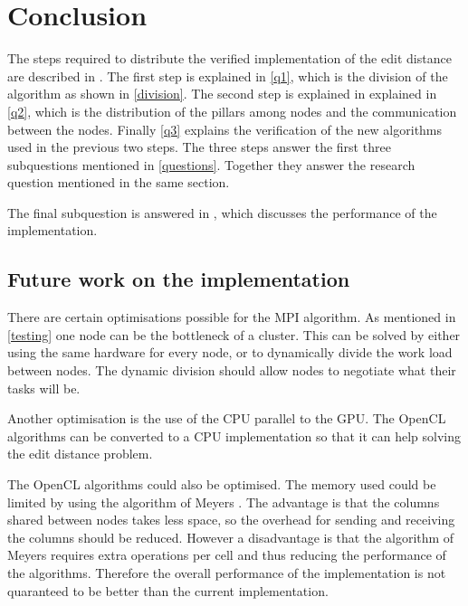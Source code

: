 \section{Conclusion}
The steps required to distribute the verified implementation of the edit distance are described in .
The first step is explained in \cref{q1}, which is the division of the algorithm as shown in \cref{division}.
The second step is explained in explained in \cref{q2}, which is the distribution of the pillars among nodes and the communication between the nodes.
Finally \cref{q3} explains the verification of the new algorithms used in the previous two steps.
The three steps answer the first three subquestions mentioned in \cref{questions}.
Together they answer the research question mentioned in the same section.

The final subquestion is answered in , which discusses the performance of the implementation.

\subsection{Future work on the implementation}
There are certain optimisations possible for the MPI algorithm.
As mentioned in \cref{testing} one node can be the bottleneck of a cluster.
This can be solved by either using the same hardware for every node, or to dynamically divide the work load between nodes.
The dynamic division should allow nodes to negotiate what their tasks will be.

Another optimisation is the use of the CPU parallel to the GPU.
The OpenCL algorithms can be converted to a CPU implementation so that it can help solving the edit distance problem.

The OpenCL algorithms could also be optimised.
The memory used could be limited by using the algorithm of Meyers \cite{Meyers}.
The advantage is that the columns shared between nodes takes less space, so the overhead for sending and receiving the columns should be reduced.
However a disadvantage is that the algorithm of Meyers requires extra operations per cell and thus reducing the performance of the algorithms.
Therefore the overall performance of the implementation is not quaranteed to be better than the current implementation.
